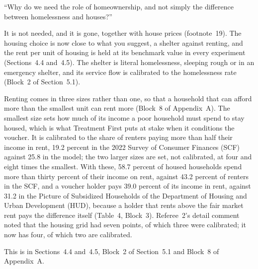 \documentclass[11pt]{article}
\begin{document}
\begin{referee}
``Why do we need the role of homeownership, and not simply the difference between
homelessness and houses?''
\end{referee}
\begin{response}
\concede It is not needed, and it is gone, together with house prices
(footnote~19). The housing choice is now close to what you suggest, a shelter
against renting, and the rent per unit of housing is held at its benchmark value in
every experiment (Sections~4.4 and~4.5). The shelter is literal homelessness,
sleeping rough or in an emergency shelter, and its service flow is calibrated to
the homelessness rate (Block~2 of Section~5.1).

Renting comes in three sizes rather than one, so that a household that can afford
more than the smallest unit can rent more (Block~8 of Appendix~A). The smallest size
sets how much of its income a poor household must spend to stay housed, which is
what Treatment First puts at stake when it conditions the voucher. It is calibrated
to the share of renters paying more than half their income in rent, 19.2 percent in
the 2022 Survey of Consumer Finances (SCF) against 25.8 in the model; the two larger
sizes are set, not calibrated, at four and eight times the smallest. With these,
58.7 percent of housed households spend more than thirty percent of their income on
rent, against 43.2 percent of renters in the SCF, and a voucher holder pays 39.0
percent of its income in rent, against 31.2 in the Picture of Subsidized Households
of the Department of Housing and Urban Development (HUD), because a holder that
rents above the fair market rent pays the difference itself (Table~4, Block~3).
Referee~2's detail comment noted that the housing grid had seven points, of which
three were calibrated; it now has four, of which two are calibrated.

This is in Sections~4.4 and~4.5, Block~2 of Section~5.1 and Block~8 of Appendix~A.
\end{response}
\end{document}
